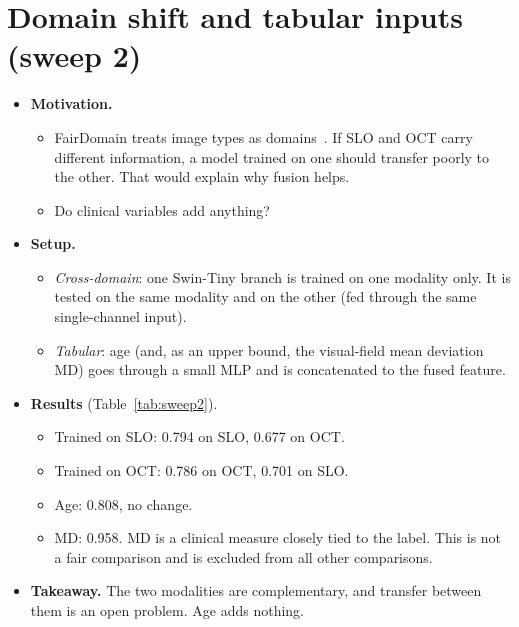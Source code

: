 \documentclass[11pt]{article}
\begin{document}
\section{Domain shift and tabular inputs (sweep 2)}\label{app:domain}
\begin{itemize}
\item \textbf{Motivation.}
  \begin{itemize}
  \item FairDomain treats image types as domains~\cite{fairdomain}. If SLO and OCT carry different information, a model trained on one should transfer poorly to the other. That would explain why fusion helps.
  \item Do clinical variables add anything?
  \end{itemize}
\item \textbf{Setup.}
  \begin{itemize}
  \item \emph{Cross-domain}: one Swin-Tiny branch is trained on one modality only. It is tested on the same modality and on the other (fed through the same single-channel input).
  \item \emph{Tabular}: age (and, as an upper bound, the visual-field mean deviation MD) goes through a small MLP and is concatenated to the fused feature.
  \end{itemize}
\item \textbf{Results} (Table~\ref{tab:sweep2}).
  \begin{itemize}
  \item Trained on SLO: 0.794 on SLO, 0.677 on OCT.
  \item Trained on OCT: 0.786 on OCT, 0.701 on SLO.
  \item Age: 0.808, no change.
  \item MD: 0.958. MD is a clinical measure closely tied to the label. This is not a fair comparison and is excluded from all other comparisons.
  \end{itemize}
\item \textbf{Takeaway.} The two modalities are complementary, and transfer between them is an open problem. Age adds nothing.
\end{itemize}

\begin{table}[h]
\centering\footnotesize
\setlength{\tabcolsep}{3pt}
\resizebox{\linewidth}{!}{}
\caption{Sweep 2: stronger recipe on Swin-Tiny, 25 epochs. The ``+ age and MD'' row is an upper bound and not a fair comparison.}
\label{tab:sweep2}
\end{table}
\end{document}
